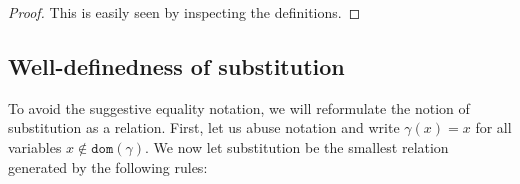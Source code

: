 \documentclass{lmcs}
\theoremstyle{theorem}\newtheorem{theorem}{Theorem}
\theoremstyle{theorem}\newtheorem{lemma}[theorem]{Lemma}
\theoremstyle{theorem}\newtheorem{corollary}[theorem]{Corollary}
\theoremstyle{definition}\newtheorem{definition}[theorem]{Definition}
\theoremstyle{definition}\newtheorem{example}[theorem]{Example}
\newcommand{\domain}{\mathtt{dom}}
\begin{document}
\begin{proof}
This is easily seen by inspecting the definitions.
\end{proof}

\subsection{Well-definedness of substitution}

\newcommand{\subrel}[1]{\mathsf{subst}(#1)}

To avoid the suggestive equality notation, we will reformulate the notion of
substitution as a relation.  First, let us abuse notation and write
$\gamma(x) = x$ for all variables $x \notin \domain(\gamma)$.  We now let
substitution be the smallest relation generated by the following rules:
\end{document}
